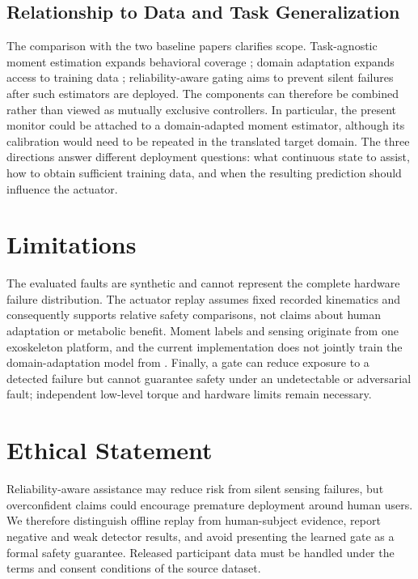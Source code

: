 \documentclass[letterpaper]{article} %
\begin{document}
\subsection{Relationship to Data and Task Generalization}

The comparison with the two baseline papers clarifies scope.
Task-agnostic moment estimation expands behavioral coverage \citep{molinaro2024task}; domain adaptation expands access to training data \citep{scherpereel2025domain}; reliability-aware gating aims to prevent silent failures after such estimators are deployed.
The components can therefore be combined rather than viewed as mutually exclusive controllers.
In particular, the present monitor could be attached to a domain-adapted moment estimator, although its calibration would need to be repeated in the translated target domain.
The three directions answer different deployment questions: what continuous state to assist, how to obtain sufficient training data, and when the resulting prediction should influence the actuator.

\section{Limitations}

The evaluated faults are synthetic and cannot represent the complete hardware failure distribution.
The actuator replay assumes fixed recorded kinematics and consequently supports relative safety comparisons, not claims about human adaptation or metabolic benefit.
Moment labels and sensing originate from one exoskeleton platform, and the current implementation does not jointly train the domain-adaptation model from \citet{scherpereel2025domain}.
Finally, a gate can reduce exposure to a detected failure but cannot guarantee safety under an undetectable or adversarial fault; independent low-level torque and hardware limits remain necessary.

\section{Ethical Statement}

Reliability-aware assistance may reduce risk from silent sensing failures, but overconfident claims could encourage premature deployment around human users.
We therefore distinguish offline replay from human-subject evidence, report negative and weak detector results, and avoid presenting the learned gate as a formal safety guarantee.
Released participant data must be handled under the terms and consent conditions of the source dataset.
\end{document}
